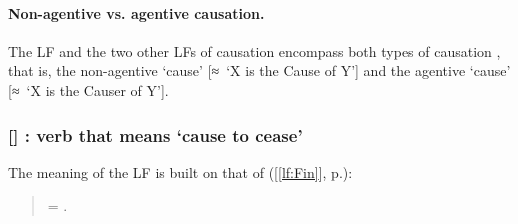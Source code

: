 \paragraph*{Non-agentive vs. agentive causation.}\label{par:Cause1Cause2}

The LF  and the two other LFs of causation encompass both types of causation \parencites{KahaneMelcuk2006}[Ch.~5]{Melcuk2012a-e}, that is, the non-agentive `cause' [≈~`X is the Cause of Y'] and the agentive `cause' [≈~`X is the Causer of Y'].

\subsubsection*{{\small []}  : verb that means `cause to cease'}\label{lf:Liqu}

The meaning of the LF  is built on that of  ([\ref{lf:Fin}], p.\thinspace\pageref{lf:Fin}):

\begin{quote}

 = .

\end{quote}

